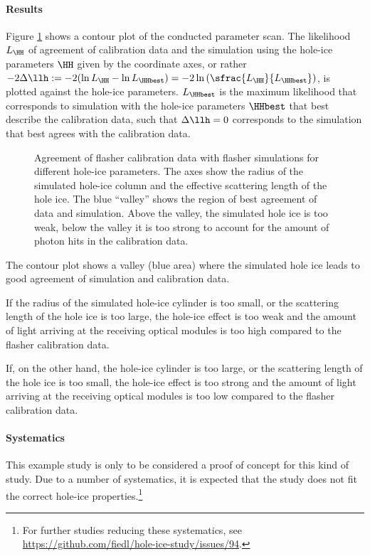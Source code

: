 \paragraph{Results}
Figure \ref{fig:ut4nao7X} shows a contour plot of the conducted parameter scan. The likelihood $L_\HH$ of agreement of calibration data and the simulation using the hole-ice parameters $\HH$ given by the coordinate axes, or rather $-2\Delta\llh:= -2(\ln L_\HH - \ln L_\HHbest) = -2 \ln \left(\sfrac{L_\HH}{L_\HHbest}\right)$, is plotted against the hole-ice parameters. $L_\HHbest$ is the maximum likelihood that corresponds to simulation with the hole-ice parameters $\HHbest$ that best describe the calibration data, such that $\Delta\llh = 0$ corresponds to the simulation that best agrees with the calibration data.

\begin{figure}[htbp]
  \caption{Agreement of flasher calibration data with flasher simulations for different hole-ice parameters. The axes show the radius of the simulated hole-ice column and the effective scattering length of the hole ice. The blue ``valley'' shows the region of best agreement of data and simulation. Above the valley, the simulated hole ice is too weak, below the valley it is too strong to account for the amount of photon hits in the calibration data.}
  \label{fig:ut4nao7X}
\end{figure}

The contour plot shows a valley (blue area) where the simulated hole ice leads to good agreement of simulation and calibration data.

If the radius of the simulated hole-ice cylinder is too small, or the scattering length of the hole ice is too large, the hole-ice effect is too weak and the amount of light arriving at the receiving optical modules is too high compared to the flasher calibration data.

If, on the other hand, the hole-ice cylinder is too large, or the scattering length of the hole ice is too small, the hole-ice effect is too strong and the amount of light arriving at the receiving optical modules is too low compared to the flasher calibration data.


\paragraph{Systematics}
This example study is only to be considered a proof of concept for this kind of study. Due to a number of systematics, it is expected that the study does not fit the correct hole-ice properties.\footnote{For further studies reducing these systematics, see \url{https://github.com/fiedl/hole-ice-study/issues/94}.}


